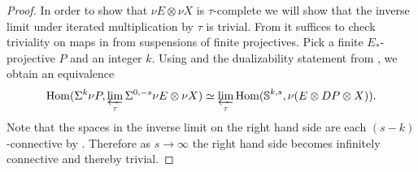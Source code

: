 \begin{proof}
  In order to show that $\nu E \otimes \nu X$ is $\tau$-complete we will show that the inverse limit under iterated multiplication by $\tau$ is trivial.
  From  it suffices to check triviality on maps in from suspensions of finite projectives.
  Pick a finite $E_*$-projective $P$ and an integer $k$. Using  and the dualizability statement from , we obtain an equivalence
  $$ \operatorname{\mathrm{Hom}}(\Sigma^k \nu P, \varprojlim_\tau \Sigma^{0,-s}\nu E \otimes \nu X) \simeq \varprojlim_\tau \operatorname{\mathrm{Hom}}(\operatorname{\mathbb{S}}^{k,s}, \nu (E \otimes DP \otimes X)). $$
  Note that the spaces in the inverse limit on the right hand side are each $(s-k)$-connective by \cite[Proposition 4.21]{Pstragowski}. Therefore as $s \to \infty$ the right hand side becomes infinitely connective and thereby trivial.
\end{proof}

